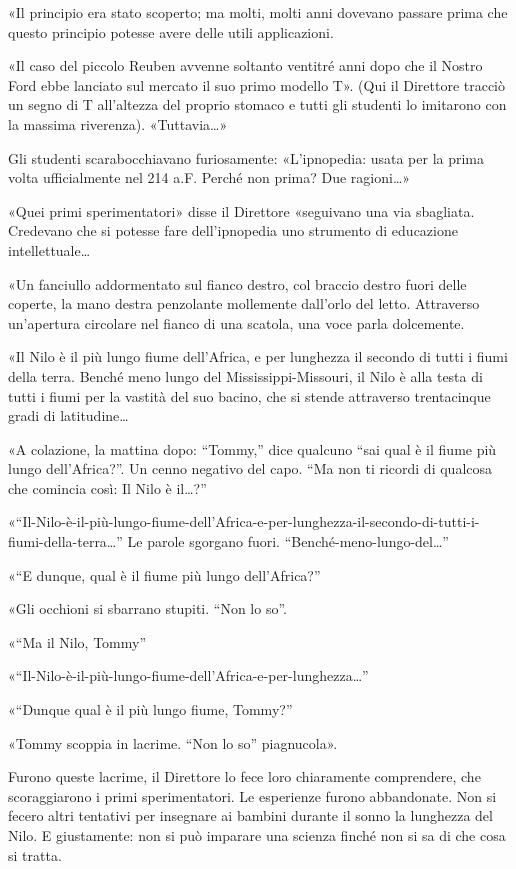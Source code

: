 \documentclass[
a5paper, %
10pt, %
twoside, 
onecolumn, %
openany, %
]{memoir}
\begin{document}
«Il principio era stato scoperto; ma molti, molti anni dovevano passare prima che questo principio potesse avere delle utili applicazioni.

«Il caso del piccolo Reuben avvenne soltanto ventitré anni dopo che il Nostro Ford ebbe lanciato sul mercato il suo primo modello T». (Qui il Direttore tracciò un segno di T all’altezza del proprio stomaco e tutti gli studenti lo imitarono con la massima riverenza). «Tuttavia…»

Gli studenti scarabocchiavano furiosamente: «L’ipnopedia: usata per la prima volta ufficialmente nel 214 a.F. Perché non prima? Due ragioni…»

«Quei primi sperimentatori» disse il Direttore «seguivano una via sbagliata. Credevano che si potesse fare dell’ipnopedia uno strumento di educazione intellettuale…

«Un fanciullo addormentato sul fianco destro, col braccio destro fuori delle coperte, la mano destra penzolante mollemente dall’orlo del letto. Attraverso un’apertura circolare nel fianco di una scatola, una voce parla dolcemente.

«Il Nilo è il più lungo fiume dell’Africa, e per lunghezza il secondo di tutti i fiumi della terra. Benché meno lungo del Mississippi-Missouri, il Nilo è alla testa di tutti i fiumi per la vastità del suo bacino, che si stende attraverso trentacinque gradi di latitudine…

«A colazione, la mattina dopo: “Tommy,” dice qualcuno “sai qual è il fiume più lungo dell’Africa?”. Un cenno negativo del capo. “Ma non ti ricordi di qualcosa che comincia così: Il Nilo è il…?”

«“Il-Nilo-è-il-più-lungo-fiume-dell’Africa-e-per-lunghezza-il-secondo-di-tutti-i-fiumi-della-terra…” Le parole sgorgano fuori. “Benché-meno-lungo-del…”

«“E dunque, qual è il fiume più lungo dell’Africa?”

«Gli occhioni si sbarrano stupiti. “Non lo so”.

«“Ma il Nilo, Tommy”

«“Il-Nilo-è-il-più-lungo-fiume-dell’Africa-e-per-lunghezza…”

«“Dunque qual è il più lungo fiume, Tommy?”

«Tommy scoppia in lacrime. “Non lo so” piagnucola».

Furono queste lacrime, il Direttore lo fece loro chiaramente comprendere, che scoraggiarono i primi sperimentatori. Le esperienze furono abbandonate. Non si fecero altri tentativi per insegnare ai bambini durante il sonno la lunghezza del Nilo. E giustamente: non si può imparare una scienza finché non si sa di che cosa si tratta.
\end{document}
